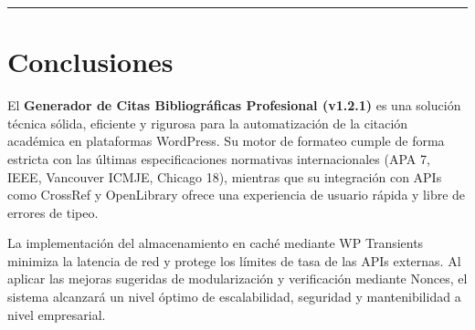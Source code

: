 \documentclass[11pt, a4paper]{article}
\begin{document}
\bigskip\noindent\rule{\textwidth}{0.4pt}\bigskip


\section{Conclusiones}

El \textbf{Generador de Citas Bibliográficas Profesional (v1.2.1)} es una solución técnica sólida, eficiente y rigurosa para la automatización de la citación académica en plataformas WordPress. Su motor de formateo cumple de forma estricta con las últimas especificaciones normativas internacionales (APA 7, IEEE, Vancouver ICMJE, Chicago 18), mientras que su integración con APIs como CrossRef y OpenLibrary ofrece una experiencia de usuario rápida y libre de errores de tipeo.


La implementación del almacenamiento en caché mediante WP Transients minimiza la latencia de red y protege los límites de tasa de las APIs externas. Al aplicar las mejoras sugeridas de modularización y verificación mediante Nonces, el sistema alcanzará un nivel óptimo de escalabilidad, seguridad y mantenibilidad a nivel empresarial.
\end{document}

